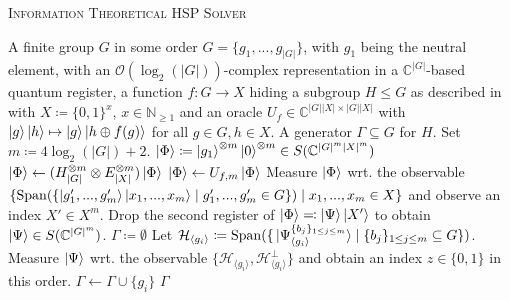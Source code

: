\documentclass[10pt]{amsart}
\theoremstyle{definition}
\theoremstyle{remark}
\DeclareMathOperator{\Span}{Span}
\newcommand{\onot}{\mathcal{O}}
\begin{document}
    {\centering\begin{minipage}{\linewidth}
        \vspace{-0.25cm}
        \begin{algorithm}[H]
            \caption{\textsc{Information Theoretical HSP Solver}}
            \label{information_theoretical_hsp_solver}
            \begin{algorithmic}[1]
                \Require A finite group \(G\) in some order \(G = \{g_1, ..., g_{|G|}\}\), with \(g_1\) being the neutral element, with an \(\onot(\log_2(|G|))\)-complex representation in a \(\mathbb{C}^{|G|}\)-based quantum register, a function \(f\colon G \to X\) hiding a subgroup \(H \leq G\) as described in  with \(X \coloneqq \{0, 1\}^x\), \(x \in \mathbb{N}_{\geq 1}\) and an oracle \(U_f \in \mathbb{C}^{|G||X| \times |G||X|}\) with \(\ket{g}\ket{h} \mapsto \ket{g}\ket{h \oplus f(g)}\) for all \(g \in G, h \in X\).
                \Ensure A generator \(\Gamma \subseteq G\) for \(H\).
                \State Set \(m \coloneqq 4\log_2(|G|)+2\). \label{information_theoretical_hsp_solver_1}
                \State \(\ket{\Phi} \coloneqq \ket{g_1}^{\otimes m}\ket{0}^{\otimes m} \in S(\mathbb{C}^{|G|^m|X|^m})\)
                \State \(\ket{\Phi} \gets (H_{|G|}^{\otimes m} \otimes E_{|X|}^{\otimes m})\ket{\Phi}\)
                \State \(\ket{\Phi} \gets U_{f, m} \ket{\Phi}\)
                \State Measure \(\ket{\Phi}\) wrt. the observable \(\{\Span(\{\ket{g'_1, ..., g'_m}\ket{x_1, ..., x_m} \mid g'_1, ..., g'_m \in G\}) \mid x_1, ..., x_m \in X\}\) and observe an index \(X' \in X^m\).
                \State Drop the second register of \(\ket{\Phi} \eqqcolon \ket{\Psi}\ket{X'}\) to obtain \(\ket{\Psi} \in S(\mathbb{C}^{|G|^m})\). \label{information_theoretical_hsp_solver_6}
                \State \(\Gamma \coloneqq \emptyset\)
                 \label{information_theoretical_hsp_solver_8}
                    \State Let \(\mathcal{H}_{\langle g_i \rangle} \coloneqq \Span(\{\ket*{\Psi_{\langle g_i \rangle}^{\{b_j\}_{1 \leq j \leq m}}} \mid \{b_j\}_{1 \leq j \leq m} \subseteq G\})\).
                    \State Measure \(\ket{\Psi}\) wrt. the observable \(\{\mathcal{H}_{\langle g_i \rangle}, \mathcal{H}_{\langle g_i \rangle}^\perp\}\) and obtain an index \(z \in \{0, 1\}\) in this order. \label{information_theoretical_hsp_solver_10}
                        \State \(\Gamma \gets \Gamma \cup \{g_i\}\) \label{information_theoretical_hsp_solver_12}
                    \EndIf
                \EndFor
                \State \Return \(\Gamma\)
            \end{algorithmic}
        \end{algorithm}
    \end{minipage}\par} \phantom{}
\end{document}
